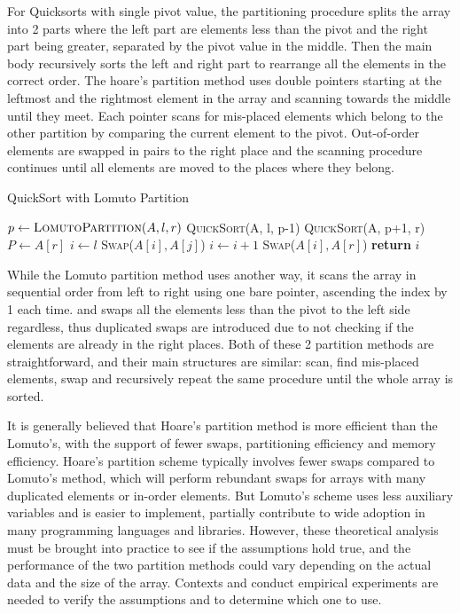 \documentclass{article}
\begin{document}
For Quicksorts with single pivot value, the partitioning procedure splits the array into 2 parts where the left part are elements less than the pivot and the right part being greater, 
separated by the pivot value in the middle. Then the main body recursively sorts the left and right part to rearrange all the elements in the correct order. The hoare's partition method
uses double pointers starting at the leftmost and the rightmost element in the array and scanning towards the middle until they meet. Each pointer scans for mis-placed elements 
which belong to the other partition by comparing the current element to the pivot. 
Out-of-order elements are swapped in pairs to the right place and the scanning procedure continues until all elements 
are moved to the places where they belong.

\begin{algorithm}[H]
    \caption{QuickSort with Lomuto Partition}\label{LomutoPartition}
    \begin{algorithmic}[1]
        \State $p \gets \textsc{LomutoPartition}(A, l, r)$
        \State \textsc{QuickSort}(A, l, p-1)
        \State \textsc{QuickSort}(A, p+1, r)
        \EndIf
        \EndProcedure
        \State $P \gets A[r]$ 
        \State $i \gets l$
        \State \textsc{Swap}($A[i], A[j]$)
        \State $i \gets i + 1$
        \EndIf
        \EndFor
        \State \textsc{Swap}($A[i], A[r]$) 
        \State \textbf{return} $i$
        \EndProcedure
    \end{algorithmic}
\end{algorithm}

While the Lomuto partition method uses another way, it scans the array in sequential order from left to right using one bare pointer, ascending the index by 1 each time.
and swaps all the elements less than the pivot to the left side regardless,
thus duplicated swaps are introduced due to not checking if the elements are already in the right places. Both of these 2 partition methods are straightforward, 
and their main structures are similar: scan, find mis-placed elements, swap and recursively repeat the same procedure until the whole array is sorted.

It is generally believed that Hoare's partition method is more efficient than the Lomuto's, with the support of fewer swaps, partitioning efficiency and memory efficiency.
Hoare's partition scheme typically involves fewer swaps compared to Lomuto's method, which will perform rebundant swaps for arrays with many duplicated elements or in-order elements.
But Lomuto's scheme uses less auxiliary variables and is easier to implement, partially contribute to wide adoption in many programming languages and libraries.
However, these theoretical analysis must be brought into practice to see if the assumptions hold true, and the performance of the two partition methods could vary depending on the actual data and the size of the array.
Contexts and conduct empirical experiments are needed to verify the assumptions and to determine which one to use.
\end{document}
